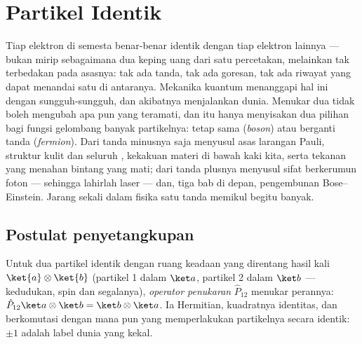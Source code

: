 \chapter{Partikel Identik}\label{ch:b3:identical-particles}

Tiap elektron di semesta benar-benar identik dengan tiap elektron
lainnya --- bukan mirip sebagaimana dua keping uang dari satu percetakan,
melainkan tak terbedakan pada asasnya: tak ada tanda, tak ada goresan,
tak ada riwayat yang dapat menandai satu di antaranya. Mekanika kuantum
menanggapi hal ini dengan sungguh-sungguh, dan akibatnya menjalankan
dunia. Menukar dua  tidak boleh mengubah apa pun yang
teramati, dan itu hanya menyisakan dua pilihan bagi fungsi gelombang
banyak partikelnya: tetap sama (\emph{boson}) atau berganti tanda
(\emph{fermion}). Dari tanda minusnya saja menyusul asas larangan Pauli,
struktur kulit dan seluruh , kekakuan materi di bawah kaki
kita, serta tekanan yang menahan bintang yang mati; dari tanda plusnya
menyusul sifat berkerumun foton --- sehingga lahirlah laser --- dan,
tiga bab di depan, pengembunan Bose--Einstein. Jarang sekali dalam
fisika satu tanda memikul begitu banyak.

\section{Postulat penyetangkupan}

\begin{definition}[Penukaran]\label{def:b3:identical-particles:exchange}
Untuk dua partikel identik dengan ruang keadaan yang direntang hasil
kali $\ket{a}\otimes\ket{b}$ (partikel 1 dalam $\ket a$, partikel 2
dalam $\ket b$ --- kedudukan, spin dan segalanya), \emph{operator
penukaran} $\hat P_{12}$ menukar perannya: $\hat P_{12}\ket a\otimes\ket b =
\ket b\otimes\ket a$. Ia Hermitian, kuadratnya identitas, dan
berkomutasi dengan  mana pun yang memperlakukan partikelnya
secara identik:  $\pm1$ adalah label dunia yang kekal.
\end{definition}

